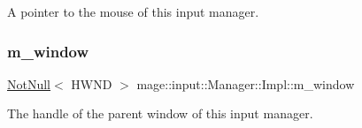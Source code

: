 A pointer to the mouse of this input manager. \mbox{\label{classmage_1_1input_1_1_manager_1_1_impl_afd49b4b35e1c1f93084d5cf31b89fe80}} 
\subsubsection{\texorpdfstring{m\+\_\+window}{m\_window}}
{\footnotesize\ttfamily \mbox{\hyperlink{namespacemage_a8769f9d670d6b585ea306cb1062af94b}{Not\+Null}}$<$ H\+W\+ND $>$ mage\+::input\+::\+Manager\+::\+Impl\+::m\+\_\+window\hspace{0.3cm}{\ttfamily [private]}}

The handle of the parent window of this input manager. 